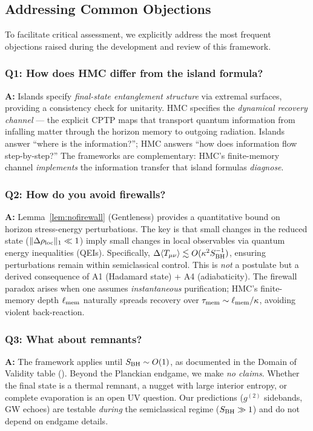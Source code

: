 \documentclass[11pt,a4paper]{article}
\theoremstyle{plain}
\theoremstyle{definition}
\theoremstyle{remark}
\begin{document}
\subsection{Addressing Common Objections}
\label{sec:skeptics_corner}

To facilitate critical assessment, we explicitly address the most frequent objections raised during the development and review of this framework.

\subsubsection{Q1: How does HMC differ from the island formula?}
\textbf{A:} Islands specify \emph{final-state entanglement structure} via extremal surfaces, providing a consistency check for unitarity. HMC specifies the \emph{dynamical recovery channel} --- the explicit CPTP maps that transport quantum information from infalling matter through the horizon memory to outgoing radiation. Islands answer ``where is the information?''; HMC answers ``how does information flow step-by-step?'' The frameworks are complementary: HMC's finite-memory channel \emph{implements} the information transfer that island formulas \emph{diagnose}.

\subsubsection{Q2: How do you avoid firewalls?}
\textbf{A:} Lemma~\ref{lem:nofirewall} (Gentleness) provides a quantitative bound on horizon stress-energy perturbations. The key is that small changes in the reduced state ($\|\Delta\rho_{\rm loc}\|_1 \ll 1$) imply small changes in local observables via quantum energy inequalities (QEIs). Specifically, $\Delta \langle T_{\mu\nu} \rangle \lesssim O(\kappa^2 S_{\rm BH}^{-1})$, ensuring perturbations remain within semiclassical control. This is \emph{not} a postulate but a derived consequence of A1 (Hadamard state) + A4 (adiabaticity). The firewall paradox arises when one assumes \emph{instantaneous} purification; HMC's finite-memory depth $\ell_{\rm mem}$ naturally spreads recovery over $\tau_{\rm mem} \sim \ell_{\rm mem}/\kappa$, avoiding violent back-reaction.

\subsubsection{Q3: What about remnants?}
\textbf{A:} The framework applies until $S_{\rm BH} \sim O(1)$, as documented in the Domain of Validity table (). Beyond the Planckian endgame, we make \emph{no claims}. Whether the final state is a thermal remnant, a nugget with large interior entropy, or complete evaporation is an open UV question. Our predictions ($g^{(2)}$ sidebands, GW echoes) are testable \emph{during} the semiclassical regime ($S_{\rm BH} \gg 1$) and do not depend on endgame details.
\end{document}
